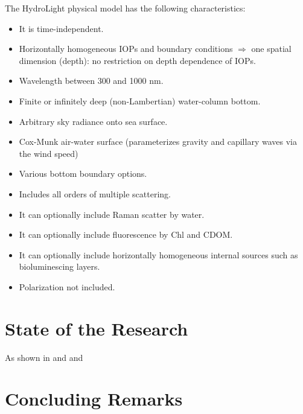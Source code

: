The HydroLight physical model has the following characteristics:

\begin{itemize}
	\item It is time-independent.
	\item Horizontally homogeneous IOPs and boundary conditions $\Rightarrow$ one spatial dimension (depth): no restriction on depth dependence of IOPs.
	\item Wavelength between 300 and 1000 nm.
	\item Finite or infinitely deep (non-Lambertian) water-column bottom.
	\item Arbitrary sky radiance onto sea surface.
	\item Cox-Munk air-water surface (parameterizes gravity and capillary waves via the wind speed)
	\item Various bottom boundary options.
	\item Includes all orders of multiple scattering.
	\item It can optionally include Raman scatter by water.
	\item It can optionally include fluorescence by Chl and CDOM.
	\item It can optionally include horizontally homogeneous internal sources such as bioluminescing layers.
	\item Polarization not included.
\end{itemize}

\section{State of the Research}

As shown in \cite{GeraceThesis}
and \cite{Mobley:2005} and \cite{Lesser}

\section{Concluding Remarks}